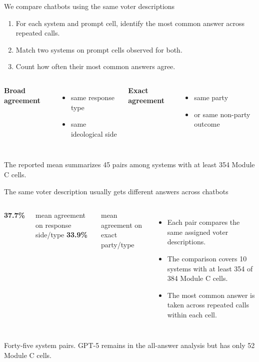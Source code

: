 \documentclass[aspectratio=169,11pt]{beamer}
\newcommand{\source}[1]{\vfill{\fontsize{8}{10}\selectfont\color{muted}#1}}
\newcommand{\key}[1]{{\color{navy}\bfseries #1}}
\newcommand{\metric}[2]{{\color{navy}\fontsize{25}{28}\selectfont\bfseries #1}\par{\color{muted}\fontsize{10}{12}\selectfont #2}}
\begin{document}
\begin{frame}{We compare chatbots using the same voter descriptions}
\begin{enumerate}
\item For each system and prompt cell, identify the most common answer across repeated calls.
\item Match two systems on prompt cells observed for both.
\item Count how often their most common answers agree.
\end{enumerate}
\vspace{.3cm}
\begin{columns}[T,onlytextwidth]
\key{Broad agreement}
\begin{itemize}
\item same response type
\item same ideological side
\end{itemize}
\key{Exact agreement}
\begin{itemize}
\item same party
\item or same non-party outcome
\end{itemize}
\end{columns}
\source{The reported mean summarizes 45 pairs among systems with at least 354 Module C cells.}
\end{frame}
\begin{frame}{The same voter description usually gets different answers across chatbots}
\begin{columns}[T,onlytextwidth]
\metric{37.7\%}{mean agreement on response side/type}\vspace{.25cm}
\metric{33.9\%}{mean agreement on exact party/type}
\begin{itemize}
\item Each pair compares the same assigned voter descriptions.
\item The comparison covers 10 systems with at least 354 of 384 Module C cells.
\item The most common answer is taken across repeated calls within each cell.
\end{itemize}
\end{columns}
\source{Forty-five system pairs. GPT-5 remains in the all-answer analysis but has only 52 Module C cells.}
\end{frame}
\end{document}
